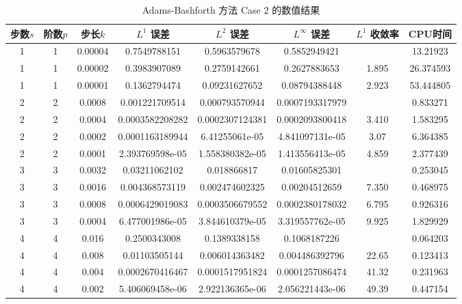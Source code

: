 \documentclass[a4paper]{article}
\begin{document}
\begin{table}
    \centering
    \caption{Adams-Bashforth 方法 Case 2 的数值结果}
    \begin{tabular}{|c|c|c|c|c|c|c|c|}
        \hline
        步数$s$ & 阶数$p$ & 步长$k$ & $L^1$ 误差  & $L^2$ 误差 & $L^\infty$ 误差 & $L^1$ 收敛率 & CPU时间 \\
        \hline
        1 & 1 & 0.00004 & 0.7549788151 & 0.5963579678 & 0.5852949421 & ~ & 13.21923 \\
        1 & 1 & 0.00002 & 0.3983907089 & 0.2759142661 & 0.2627883653 & 1.895 & 26.374593 \\
        1 & 1 & 0.00001 & 0.1362794474 & 0.09231627652 & 0.08794388448 & 2.923 & 53.444805 \\
        \hline 
        2 & 2 & 0.0008 & 0.001221709514 & 0.000793570944 & 0.0007193317979 & ~ & 0.833271 \\
        2 & 2 & 0.0004 & 0.0003582208282 & 0.0002307124381 & 0.0002093800418 & 3.410 & 1.583295 \\
        2 & 2 & 0.0002 & 0.0001163189944 & 6.41255061e-05 & 4.841097131e-05 & 3.07 & 6.364385 \\
        2 & 2 & 0.0001 & 2.393769598e-05 & 1.558380382e-05 & 1.413556413e-05 & 4.859 & 2.377439 \\
        \hline 
        3 & 3 & 0.0032 & 0.03211062102 & 0.018866817 & 0.01605825301 & ~ & 0.253045 \\
        3 & 3 & 0.0016 & 0.004368573119 & 0.002474602325 & 0.00204512659 & 7.350 & 0.468975 \\
        3 & 3 & 0.0008 & 0.0006429019083 & 0.0003506679552 & 0.0002380178032 & 6.795 & 0.926316 \\
        3 & 3 & 0.0004 & 6.477001986e-05 & 3.844610379e-05 & 3.319557762e-05 & 9.925 & 1.829929 \\
        \hline 
        4 & 4 & 0.016 & 0.2500343008 & 0.1389338158 & 0.1068187226 & ~ & 0.064203 \\ 
        4 & 4 & 0.008 & 0.01103505144 & 0.006014363482 & 0.004486392796 & 22.65 & 0.123413 \\
        4 & 4 & 0.004 & 0.0002670416467 & 0.0001517951824 & 0.0001257086474 & 41.32 & 0.231963 \\
        4 & 4 & 0.002 & 5.406069458e-06 & 2.922136365e-06 & 2.056221443e-06 & 49.39 & 0.447154 \\
        \hline 
    \end{tabular}
\end{table}
\end{document}
